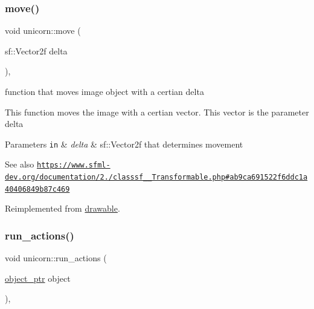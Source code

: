 \subsubsection{\texorpdfstring{move()}{move()}}
{\footnotesize\ttfamily void unicorn\+::move (\begin{DoxyParamCaption}\item[{sf\+::\+Vector2f}]{delta }\end{DoxyParamCaption})\hspace{0.3cm}{\ttfamily [override]}, {\ttfamily [virtual]}}



function that moves image object with a certian delta 

This function moves the image with a certian vector. This vector is the parameter delta


\begin{DoxyParams}[1]{Parameters}
\mbox{\tt in}  & {\em delta} & sf\+::\+Vector2f that determines movement\\
\hline
\end{DoxyParams}
\begin{DoxySeeAlso}{See also}
\href{https://www.sfml-dev.org/documentation/2.0/classsf_1_1Transformable.php#ab9ca691522f6ddc1a40406849b87c469}{\tt https\+://www.\+sfml-\/dev.\+org/documentation/2./classsf\+\_\+\_\+Transformable.\+php\#ab9ca691522f6ddc1a40406849b87c469} 
\end{DoxySeeAlso}


Reimplemented from \hyperlink{classdrawable_ad0d3930c045cc6776aa2c3965be32491}{drawable}.

\mbox{\label{classunicorn_aadb47a9981c46d6add8704074df117df}} 
\subsubsection{\texorpdfstring{run\+\_\+actions()}{run\_actions()}}
{\footnotesize\ttfamily void unicorn\+::run\+\_\+actions (\begin{DoxyParamCaption}\item[{\hyperlink{drawable_8hpp_aab5add95f06d2ba25dbfed8eb07274fa}{object\+\_\+ptr}}]{object }\end{DoxyParamCaption})\hspace{0.3cm}{\ttfamily [override]}, {\ttfamily [virtual]}}



